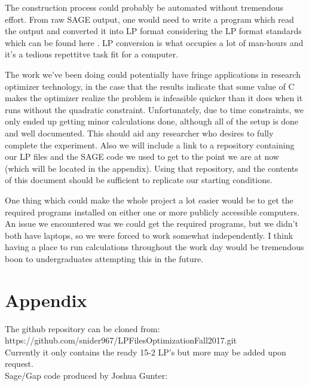 \documentclass[11pt]{article} %
\theoremstyle{definition}
\theoremstyle{remark}
\begin{document}
The construction process could probably be automated without tremendous effort. From raw SAGE output, one would need to write a program which read the output and converted it into LP format considering the LP format standards which can be found here \cite{some}. LP conversion is what occupies a lot of man-hours and it's a tedious repettitve task fit for a computer.

The work we've been doing could potentially have fringe applications in research optimizer technology, in the case that the results indicate that some value of C makes the optimizer realize the problem is infeasible quicker than it does when it runs without the quadratic constraint. Unfortunately, due to time constraints, we only ended up getting minor calculations done, although all of the setup is done and well documented. This should aid any researcher who desires to fully complete the experiment. Also we will include a link to a repository containing our LP files and the SAGE code we used to get to the point we are at now (which will be located in the appendix). Using that repository, and the contents of this document should be sufficient to replicate our starting conditions. 

One thing which could make the whole project a lot easier would be to get the required programs installed on either one or more publicly accessible computers. An issue we encountered was we could get the required programs, but we didn't both have laptops, so we were forced to work somewhat independently. I think having a place to run calculations throughout the work day would be tremendous boon to undergraduates attempting this in the future.

\section{Appendix}

The github repository can be cloned from:\\
https://github.com/snider967/LPFilesOptimizationFall2017.git\\
Currently it only contains the ready 15-2 LP's but more may be added upon request.\\
Sage/Gap code produced by Joshua Gunter:
\end{document}
